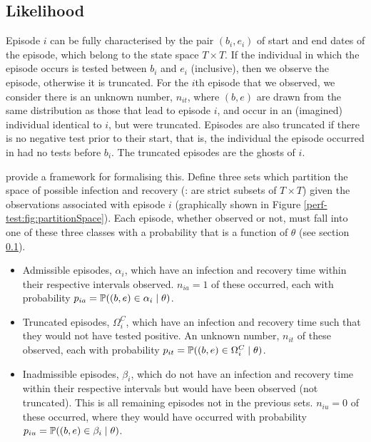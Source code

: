 \documentclass[thesis.tex]{subfiles}
\begin{document}
\subsection{Likelihood}\label{perf-test:sec:likelihood}

Episode $i$ can be fully characterised by the pair $(b_i, e_i)$ of
start and end dates of the episode, which belong to the state space
$T \times T$. If the individual in which the episode occurs is tested
between $b_i$ and $e_i$ (inclusive), then we observe the episode,
otherwise it is truncated. For the $i$th episode that we observed, we
consider there is an unknown number, $n_{it}$, where $(b, e)$ are
drawn from the same distribution as those that lead to episode $i$,
and occur in an (imagined) individual identical to $i$, but were
truncated. Episodes are also truncated if there is no negative test
prior to their start, that is, the individual the episode occurred in
had no tests before $b_i$. The truncated episodes are the ghosts of $i$.

\Textcite{heiseyModelling} provide a framework for formalising this.
Define three sets which partition the space of possible infection and
recovery (\ie: are strict subsets of $T \times T$) given the
observations associated with episode $i$ (graphically shown in Figure
\ref{perf-test:fig:partitionSpace}). Each episode, whether observed or not, must
fall into one of these three classes with a probability that is a
function of $\theta$ (see section \ref{perf-test:sec:likelihood}).

\begin{itemize}
\item
  Admissible episodes, $\alpha_i$, which have an infection and
  recovery time within their respective intervals observed.
  $n_{ia} =1$ of these occurred, each with probability
  $p_{ia} = \operatorname{\mathbb{P}}((b, e) \in \alpha_i \mid \theta)$.
\item
  Truncated episodes, $\Omega_i^C$, which have an infection and
  recovery time such that they would not have tested positive. An
  unknown number, $n_{it}$ of these observed, each with probability
  $p_{it} = \operatorname{\mathbb{P}}((b, e) \in \Omega^C_i \mid \theta)$.
\item
  Inadmissible episodes, $\beta_i$, which do not have an infection and
  recovery time within their respective intervals but would have been
  observed (not truncated). This is all remaining episodes not in the
  previous sets. $n_{iu} = 0$ of these occurred, where they would have
  occurred with probability
  $p_{iu} = \operatorname{\mathbb{P}}((b, e) \in \beta_i \mid \theta)$.
\end{itemize}
\end{document}
